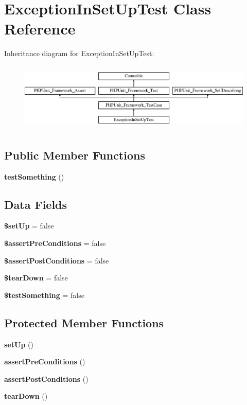 \section{Exception\+In\+Set\+Up\+Test Class Reference}
\label{class_exception_in_set_up_test}
Inheritance diagram for Exception\+In\+Set\+Up\+Test\+:\begin{figure}[H]
\begin{center}
\leavevmode
\includegraphics[height=3.303835cm]{class_exception_in_set_up_test}
\end{center}
\end{figure}
\subsection*{Public Member Functions}
\begin{DoxyCompactItemize}
\item 
{\bf test\+Something} ()
\end{DoxyCompactItemize}
\subsection*{Data Fields}
\begin{DoxyCompactItemize}
\item 
{\bf \$set\+Up} = false
\item 
{\bf \$assert\+Pre\+Conditions} = false
\item 
{\bf \$assert\+Post\+Conditions} = false
\item 
{\bf \$tear\+Down} = false
\item 
{\bf \$test\+Something} = false
\end{DoxyCompactItemize}
\subsection*{Protected Member Functions}
\begin{DoxyCompactItemize}
\item 
{\bf set\+Up} ()
\item 
{\bf assert\+Pre\+Conditions} ()
\item 
{\bf assert\+Post\+Conditions} ()
\item 
{\bf tear\+Down} ()
\end{DoxyCompactItemize}
